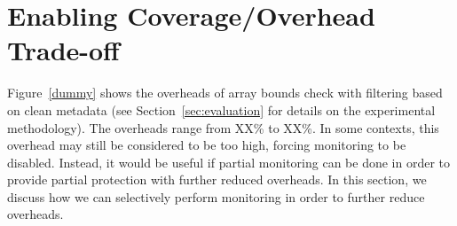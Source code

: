 \section{Enabling Coverage/Overhead Trade-off}
\label{sec:drop}

Figure~\ref{dummy} shows the overheads of array bounds check with filtering
based on clean metadata (see Section~\ref{sec:evaluation} for details on
the experimental methodology). The overheads range from XX\% to XX\%. In some
contexts, this overhead may still be considered to be too high, forcing
monitoring to be disabled. Instead, it would be useful if partial monitoring
can be done in order to provide partial protection with further reduced
overheads. In this
section, we discuss how we can selectively perform monitoring in order to
further reduce overheads.


